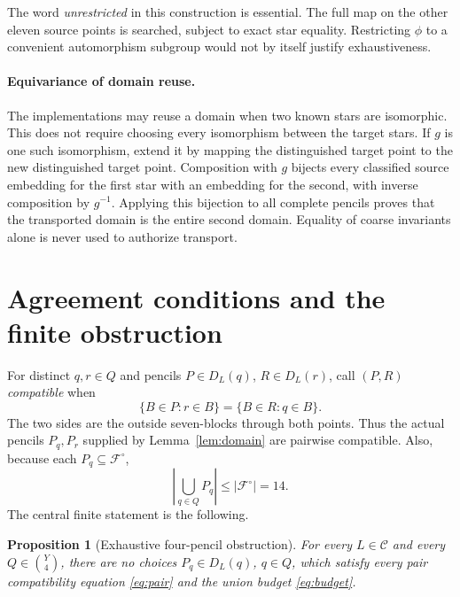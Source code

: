 \documentclass[11pt]{article}
\newcommand{\bin}[2]{\binom{#1}{#2}}
\newcommand{\coverfam}{\mathcal F}
\newcommand{\cat}{\mathcal C}
\newtheorem{proposition}[theorem]{Proposition}
\theoremstyle{definition}
\theoremstyle{remark}
\begin{document}
The word \emph{unrestricted} in this construction is essential.
The full map on the other eleven source points is searched, subject
to exact star equality. Restricting $\phi$ to a convenient
automorphism subgroup would not by itself justify exhaustiveness.

\paragraph{Equivariance of domain reuse.}
The implementations may reuse a domain when two known stars are
isomorphic. This does not require choosing every isomorphism between
the target stars. If $g$ is one such isomorphism, extend it by mapping
the distinguished target point to the new distinguished target point.
Composition with $g$ bijects every classified source embedding for the
first star with an embedding for the second, with inverse composition
by $g^{-1}$. Applying this bijection to all complete pencils proves
that the transported domain is the entire second domain. Equality of
coarse invariants alone is never used to authorize transport.

\section{Agreement conditions and the finite obstruction}
For distinct $q,r\in Q$ and pencils $P\in D_L(q)$,
$R\in D_L(r)$, call $(P,R)$ \emph{compatible} when
\begin{equation}\label{eq:pair}
 \{B\in P:r\in B\}=\{B\in R:q\in B\}.
\end{equation}
The two sides are the outside seven-blocks through both points.
Thus the actual pencils $P_q,P_r$ supplied by Lemma~\ref{lem:domain}
are pairwise compatible. Also, because each $P_q\subseteq\coverfam^\circ$,
\begin{equation}\label{eq:budget}
 \left|\bigcup_{q\in Q}P_q\right|\leq|\coverfam^\circ|=14.
\end{equation}
The central finite statement is the following.

\begin{proposition}[Exhaustive four-pencil obstruction]
\label{prop:finite}
For every $L\in\cat$ and every $Q\in\bin{Y}{4}$, there are
no choices $P_q\in D_L(q)$, $q\in Q$, which satisfy every pair
compatibility equation \eqref{eq:pair} and the union budget
\eqref{eq:budget}.
\end{proposition}
\end{document}
